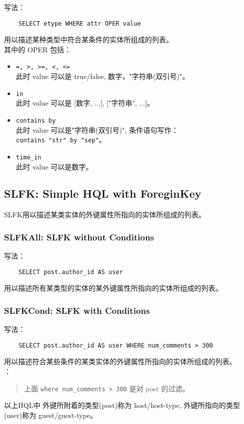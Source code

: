 \documentclass[10pt,a4paper]{article}
\begin{document}
\begin{CJK}{UTF8}{gbsn}
  写法：
\begin{verbatim}
    SELECT etype WHERE attr OPER value
\end{verbatim}
  用以描述某种类型中符合某条件的实体所组成的列表。\\
  其中的 OPER 包括：
  \begin{itemize}
  \item \texttt{=, \textgreater, \textgreater=, \textless, \textless=}
    \\
    此时 value 可以是 true/false, 数字，"字符串(双引号)"。
  \item \texttt{in} \\
    此时 value 可以是 \textsf{[数字, ...], ["字符串", ...]}。
  \item \texttt{contains by} \\
    此时 value 可以是"字符串(双引号)", 条件语句写作：\\
    \texttt{contains "str" by "sep"}。
  \item \texttt{time\_in}\\
    此时 value 可以是数字。
  \end{itemize}

  \subsection{SLFK: Simple HQL with ForeginKey}
  SLFK用以描述某类实体的外键属性所指向的实体所组成的列表。

  \subsubsection{SLFKAll: SLFK without Conditions}
  写法：
\begin{verbatim}
    SELECT post.author_id AS user
\end{verbatim}
  用以描述所有某类型的实体的某外键属性所指向的实体所组成的列表。

  \subsubsection{SLFKCond: SLFK with Conditions}
  写法：
\begin{verbatim}
    SELECT post.author_id AS user WHERE num_comments > 300
\end{verbatim}
  用以描述符合某些条件的某类实体的外键属性所指向的实体所组成的列表。\\

  {：}
  \begin{quotation}
    上面 \texttt{where num\_comments > 300} 是对 post 的过滤。
  \end{quotation}
  \label{hql-host-guest}以上HQL中 外键所附着的类型(post)称为 host/host-type, 外键所指向的类型(user)称为 guest/guest-type。


\end{CJK}
\end{document}
